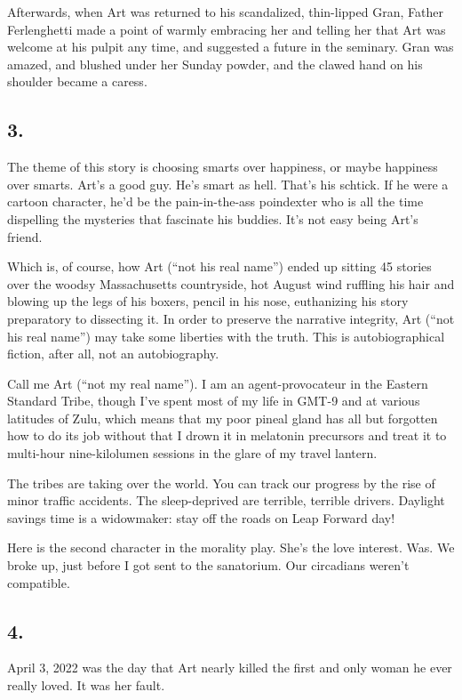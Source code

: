 Afterwards, when Art was returned to his scandalized, thin-lipped
Gran, Father Ferlenghetti made a point of warmly embracing her and
telling her that Art was welcome at his pulpit any time, and
suggested a future in the seminary. Gran was amazed, and blushed
under her Sunday powder, and the clawed hand on his shoulder became
a caress.

\subsection{3.}

The theme of this story is choosing smarts over happiness, or maybe
happiness over smarts. Art’s a good guy. He’s smart as hell. That’s
his schtick. If he were a cartoon character, he’d be the
pain-in-the-ass poindexter who is all the time dispelling the
mysteries that fascinate his buddies. It’s not easy being Art’s
friend.

Which is, of course, how Art (“not his real name”) ended up sitting
45 stories over the woodsy Massachusetts countryside, hot August
wind ruffling his hair and blowing up the legs of his boxers,
pencil in his nose, euthanizing his story preparatory to dissecting
it. In order to preserve the narrative integrity, Art (“not his
real name”) may take some liberties with the truth. This is
autobiographical fiction, after all, not an autobiography.

Call me Art (“not my real name”). I am an agent-provocateur in the
Eastern Standard Tribe, though I’ve spent most of my life in GMT-9
and at various latitudes of Zulu, which means that my poor pineal
gland has all but forgotten how to do its job without that I drown
it in melatonin precursors and treat it to multi-hour
nine-kilolumen sessions in the glare of my travel lantern.

The tribes are taking over the world. You can track our progress by
the rise of minor traffic accidents. The sleep-deprived are
terrible, terrible drivers. Daylight savings time is a widowmaker:
stay off the roads on Leap Forward day!

Here is the second character in the morality play. She’s the love
interest. Was. We broke up, just before I got sent to the
sanatorium. Our circadians weren’t compatible.

\subsection{4.}

April 3, 2022 was the day that Art nearly killed the first and only
woman he ever really loved. It was her fault.

